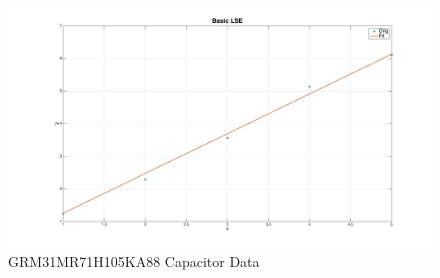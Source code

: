\begin{figure}[ht!]
\ifisPPT
\noindent{}
\else
\includegraphics[keepaspectratio=true,width=6in]{./figures/regression/basicLSE.jpg}
\fi
\centering
\caption{GRM31MR71H105KA88 Capacitor Data~\cite{simSurfing}}
\label{fig:exCapData}
\end{figure}
